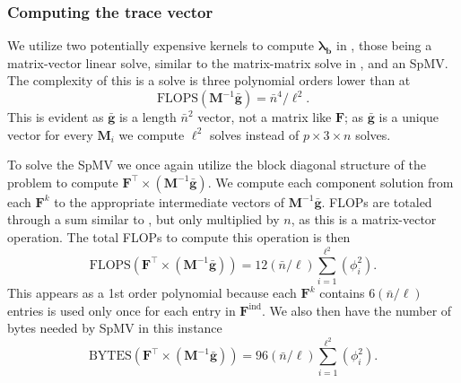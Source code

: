 

%
%
%
\subsubsection{Computing the trace vector}

%
%
%
We utilize two potentially expensive kernels to compute $\symbf{\lambda}_{\textbf{b}}$ in , those being a matrix-vector linear solve, similar to the matrix-matrix solve in , and an SpMV. 
The complexity of this is a solve is three polynomial orders lower than  at
\begin{equation}
	\text{FLOPS}(\textbf{M}^{-1}\bar{\textbf{g}}) = \bar{n}^4/\ell^2.
\end{equation}
\noindent
This is evident as $\bar{\textbf{g}}$ is a length $\bar{n}^2$ vector, not a matrix like $\textbf{F}$; as $\bar{\textbf{g}}$ is a unique vector for every $\textbf{M}_i$ we compute $\ell^2$ solves instead of $p \times 3 \times n$ solves.

%
%
%
To solve the SpMV we once again utilize the block diagonal structure of the problem to compute $\textbf{F}^\intercal \times (\textbf{M}^{-1}\bar{\textbf{g}})$. 
We compute each component solution from each $\textbf{F}^k$ to the appropriate intermediate vectors of $\textbf{M}^{-1}\bar{\textbf{g}}$.
FLOPs are totaled through a sum similar to , but only multiplied by $n$, as this is a matrix-vector operation.  
The total FLOPs to compute this operation is then 
\begin{equation}
	\text{FLOPS}(\textbf{F}^\intercal \times (\textbf{M}^{-1}\bar{\textbf{g}})) = 12(\bar{n}/\ell) \sum_{i=1}^{\ell^2} (\phi_i^2).
\end{equation}
This appears as a 1st order polynomial because each $\textbf{F}^k$ contains $6(\bar{n}/\ell)$ entries is used only once for each entry in $\textbf{F}^{\text{ind}}$.
We also then have the number of bytes needed by SpMV in this instance
\begin{equation}
	\text{BYTES}(\textbf{F}^\intercal \times (\textbf{M}^{-1}\bar{\textbf{g}})) = 96(\bar{n}/\ell) \sum_{i=1}^{\ell^2} (\phi_i^2).
\end{equation}

